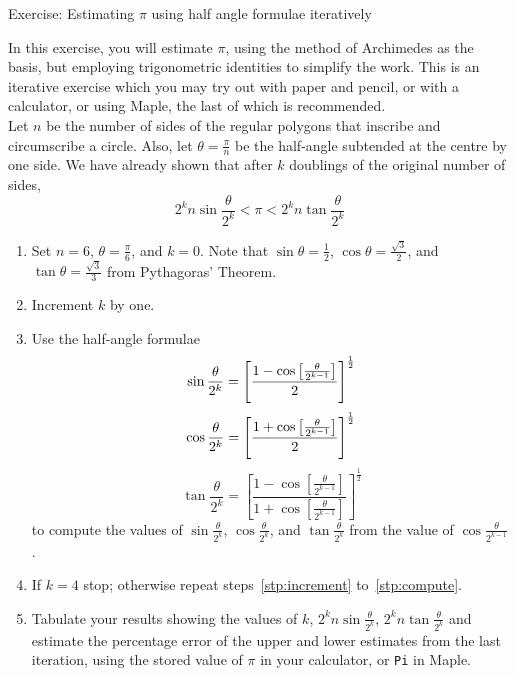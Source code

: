 \documentclass[11pt,a4paper,onecolumn]{article}
\newenvironment{exercise}{\color [named]{RawSienna} \let \parsave=\parindent%
\setlength{\parindent}{0pt} \sffamily Exercise: }%
{\setlength{\parindent}{\parsave}}
\newenvironment{edbox}[1]{\let \parsave=\parindent%
\setlength{\parindent}{0pt}%
\vspace{\parsep}\fbox%
{\parbox{\textwidth}{\vspace{\parsep}#1}}}%
{\vspace{\parsep}\setlength{\parindent}{\parsave}}
\newcommand{\maple}{Maple\textsuperscript{\textregistered}}
\newcommand{\map}{Maple}
\begin{document}
\begin{edbox}{%
\begin{exercise}{Estimating $\pi$ using half angle formulae iteratively\\}

In this exercise, you will estimate $\pi$, using the method of
Archimedes as the basis, but employing trigonometric identities to
simplify the work.  This is an iterative exercise which you may try out
with paper and pencil, or with a calculator, or using \maple, the last
of which is recommended.\\

Let $n$ be the number of sides of the regular polygons that inscribe
and circumscribe a circle.  Also, let $\theta = \frac{\pi}{n}$ be the
half-angle subtended at the centre by one side.  We have already shown
that after $k$ doublings of the original number of sides,
%
\begin{equation*}
2^{k}n\sin\frac{\theta}{2^{k}} < \pi < 2^{k}n\tan\frac{\theta}{2^{k}}
\end{equation*}
%
\begin{enumerate}
\item Set $n = 6$, $\theta = \frac{\pi}{6}$, and $k = 0$.  Note that $\sin\theta = \frac{1}{2}$, $\cos\theta = \frac{\sqrt 3}{2}$, and $\tan\theta = \frac{\sqrt 3}{3}$ from Pythagoras' Theorem.

\item Increment $k$ by one. \label{stp:increment}


\item Use the half-angle formulae \label{stp:compute}
%
\begin{equation*}
\sin\frac{\theta}{2^k} = %
\left[\frac{1-\cos\left[\frac{\theta}{2^{k-1}}\right]}{2}\right]^%
{\frac{1}{2}}
\end{equation*}
%
\begin{equation*}
\cos\frac{\theta}{2^k} = %
\left[\frac{1+\cos\left[\frac{\theta}{2^{k-1}}\right]}{2}\right]^%
{\frac{1}{2}}
\end{equation*}
%
\begin{equation*}
\tan\frac{\theta}{2^k} = %
\left[\frac{1-\cos\left[\frac{\theta}{2^{k-1}}\right]}%
{1+\cos\left[\frac{\theta}{2^{k-1}}\right]}\right]^{\frac{1}{2}}
\end{equation*}
%
to compute the values of $\sin\frac{\theta}{2^k}$, $\cos\frac{\theta}{2^k}$, and $\tan\frac{\theta}{2^k}$ from the value of $\cos\frac{\theta}{2^{k-1}}$.

\item If $k = 4$ stop; otherwise repeat steps~\ref{stp:increment} to~\ref{stp:compute}.

\item Tabulate your results showing the values of $k$, $2^{k}n\sin\frac{\theta}{2^{k}}$,  $2^{k}n\tan\frac{\theta}{2^{k}}$ and estimate the percentage error of the upper and lower estimates from the last iteration, using the stored value of $\pi$ in your calculator, or \texttt{Pi} in \map.
\end{enumerate}
\end{exercise}}
\end{edbox}
\end{document}

